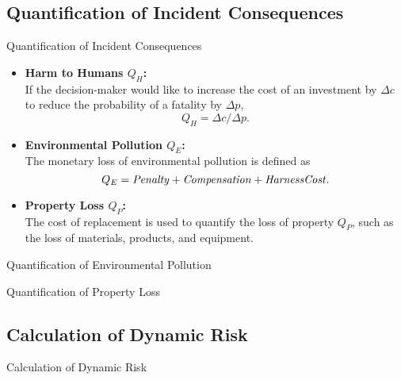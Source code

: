 \subsection{Quantification of Incident Consequences}
\begin{frame}{Quantification of Incident Consequences}
    \begin{itemize}
      \item \textbf{Harm to Humans $Q_H$:}\\
      If the decision-maker would like to increase the cost of an investment by $\Delta c$ to reduce the  probability of a fatality by $\Delta p$,
      \[
        Q_H = \Delta c/\Delta p\text{.}
      \]
      \item \textbf{Environmental Pollution $Q_E$:}\\
      The monetary loss of environmental pollution is defined as
      \[
        Q_E = {\it Penalty} + {\it Compensation} + {\it HarnessCost}\text{.}
      \]
      \item \textbf{Property Loss $Q_P$:}\\
      The cost of replacement is used to quantify the loss of property $Q_P$, such as the loss of  materials, products, and equipment.
    \end{itemize}


\end{frame}

\begin{frame}{Quantification of Environmental Pollution}
\end{frame}

\begin{frame}{Quantification of Property Loss}
\end{frame}

\subsection{Calculation of Dynamic Risk}
\begin{frame}{Calculation of Dynamic Risk}
\end{frame} 